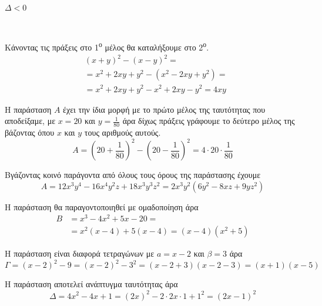 \documentclass[twoside,nofonts,internet,math,spyros]{frontisthrio-diag}
\newcommand{\tss}[1]{\textsuperscript{#1}}
\begin{document}
\begin{thema}
\begin{erwthma}
\begin{alist}
\item $ \varDelta<0 $
\end{alist}
\end{erwthma}
\item \mbox{}\\\vspace{-5mm}
\begin{erwthma}
\item Κάνοντας τις πράξεις στο 1\tss{ο} μέλος θα καταλήξουμε στο 2\tss{ο}.
\begin{align*}
&\left( x+y\right)^2-\left( x-y\right)^2=\\
&=x^2+2xy+y^2-\left(x^2-2xy+y^2 \right)=\\
&=x^2+2xy+y^2-x^2+2xy-y^2=4xy
\end{align*}
\item Η παράσταση $ A $ έχει την ίδια μορφή με το πρώτο μέλος της ταυτότητας που αποδείξαμε, με $ x=20 $ και $ y=\frac{1}{80} $ άρα δίχως πράξεις γράφουμε το δεύτερο μέλος της βάζοντας όπου $ x $ και $ y $ τους αριθμούς αυτούς.
\[ A=\left( 20+\frac{1}{80}\right)^2-\left( 20-\frac{1}{80}\right)^2=4\cdot 20\cdot \frac{1}{80} \]
\item 
\begin{alist}
\item Βγάζοντας κοινό παράγοντα από όλους τους όρους της παράστασης έχουμε
\[ A=12x^3y^4-16x^4y^2z+18x^3y^3z^2=2x^3y^2\left( 6y^2-8xz+9yz^2\right)  \]
\item Η παράσταση θα παραγοντοποιηθεί με ομαδοποίηση άρα 
\begin{align*}
B&=x^3-4x^2+5x-20=\\
&=x^2(x-4)+5(x-4)=(x-4)\left( x^2+5\right) 
\end{align*}
\item Η παράσταση είναι διαφορά τετραγώνων με $ a=x-2 $ και $ \beta=3 $ άρα
\[ \varGamma=(x-2)^2-9=(x-2)^2-3^2=(x-2+3)(x-2-3)=(x+1)(x-5) \]
\item Η παράσταση αποτελεί ανάπτυγμα ταυτότητας άρα 
\[ \varDelta=4x^2-4x+1=(2x)^2-2\cdot 2x\cdot 1+1^2=(2x-1)^2 \]
\end{alist}

\end{erwthma}
\item \mbox{}\\\vspace{-5mm}
\begin{erwthma}
\item 


\end{erwthma}
\end{thema}
\end{document}
